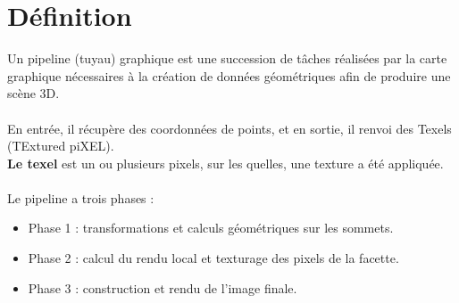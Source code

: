 \section{Définition}
Un pipeline (tuyau) graphique est une succession de tâches réalisées par la carte graphique nécessaires à la création de données géométriques afin de produire une scène 3D. \\\\
En entrée, il récupère des coordonnées de points, et en sortie, il renvoi des Texels (TExtured piXEL).\\
\textbf{Le texel} est un ou plusieurs pixels, sur les quelles, une texture a été appliquée.\\\\
Le pipeline a trois phases : 
\begin{itemize}
  \item Phase 1 : transformations et calculs géométriques sur les sommets.
  \item Phase 2 : calcul du rendu local et texturage des pixels de la facette.
  \item Phase 3 : construction et rendu de l'image finale.\end{itemize}

